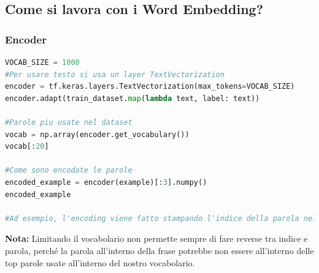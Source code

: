\subsection{Come si lavora con i Word Embedding?}

\subsubsection{Encoder}
\begin{lstlisting}[language=Python, caption={Esempio di Word Embedding}]
VOCAB_SIZE = 1000
#Per usare testo si usa un layer TextVectorization
encoder = tf.keras.layers.TextVectorization(max_tokens=VOCAB_SIZE)
encoder.adapt(train_dataset.map(lambda text, label: text))

#Parole piu usate nel dataset
vocab = np.array(encoder.get_vocabulary())
vocab[:20]

#Come sono encodate le parole
encoded_example = encoder(example)[:3].numpy()
encoded_example

#Ad esempio, l'encoding viene fatto stampando l'indice della parola nel vocabolario


\end{lstlisting}

\textbf{Nota:} Limitando il vocabolario non permette sempre di fare reverse tra indice e parola, perché la parola all'interno della frase potrebbe non essere all'interno delle top parole usate all'interno del nostro vocabolario.

\newpage